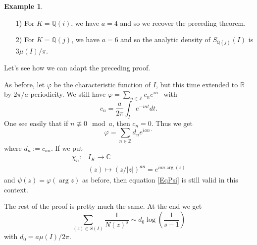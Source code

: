 \documentclass[12pt,a4paper,english]{article}
\theoremstyle{plain}
\theoremstyle{definition}
\newtheorem*{ex}{Example}
\begin{document}
\begin{ex}\textcolor{white}{.}
\begin{itemize}
    \item[1)] For $K=\mathbb{Q}(i)$, we have $a=4$ and so we recover the preceding theorem.
    \item[2)] For $K=\mathbb{Q}(j)$, we have $a=6$ and so the analytic density of $S_{\mathbb{Q}(j)}(I)$ is $3\mu(I)/\pi$.
\end{itemize}
\end{ex}
\vspace{0.5cm}

Let's see how we can adapt the preceding proof. 

As before, let $\varphi$ be the characteristic function of $I$, but this time extended to $\mathbb{R}$ by $2\pi/a$-periodicity. We still have $\varphi=\sum_{n\in\mathbb{Z}}c_n e^{in\cdot}$ with
\begin{equation*}
    c_n=\frac{a}{2\pi}\int_I e^{-int}dt.
\end{equation*}
One see easily that if $n\not\equiv 0\mod a$, then $c_n=0$. Thus we get 
\begin{equation*}
    \varphi=\sum_{n\in\mathbb{Z}}d_n e^{ian\cdot}
\end{equation*}
where $d_n:=c_{an}$. If we put
\begin{align*}
    \chi_n:&I_{K}\longrightarrow\mathbb{C}\\
    &(z)\mapsto (z/|z|)^{an}=e^{ian\arg(z)}
\end{align*}
and $\psi(z)=\varphi(\arg z)$ as before, then equation \eqref{EqPsi} is still valid in this context.

The rest of the proof is pretty much the same. At the end we get
\begin{equation*}
    \sum_{(z)\in S(I)}\frac{1}{N(z)^s}\sim d_0\log\left(\frac{1}{s-1}\right)
\end{equation*}
with $d_0=a\mu(I)/2\pi$.

%
%
\end{document}
